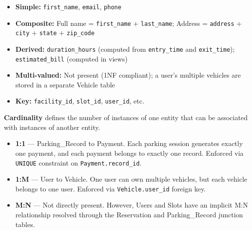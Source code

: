\documentclass[12pt,a4paper]{article}
\begin{document}
\begin{questionbox}
\end{questionbox}
\begin{answerbox}
\begin{itemize}[nosep]
    \item \textbf{Simple:} \texttt{first\_name}, \texttt{email}, \texttt{phone}
    \item \textbf{Composite:} Full name = \texttt{first\_name} + \texttt{last\_name}; Address = \texttt{address} + \texttt{city} + \texttt{state} + \texttt{zip\_code}
    \item \textbf{Derived:} \texttt{duration\_hours} (computed from \texttt{entry\_time} and \texttt{exit\_time}); \texttt{estimated\_bill} (computed in views)
    \item \textbf{Multi-valued:} Not present (1NF compliant); a user's multiple vehicles are stored in a separate Vehicle table
    \item \textbf{Key:} \texttt{facility\_id}, \texttt{slot\_id}, \texttt{user\_id}, etc.
\end{itemize}
\end{answerbox}

\begin{questionbox}
\end{questionbox}
\begin{answerbox}
\textbf{Cardinality} defines the number of instances of one entity that can be associated with instances of another entity.

\begin{itemize}[nosep]
    \item \textbf{1:1} --- Parking\_Record to Payment. Each parking session generates exactly one payment, and each payment belongs to exactly one record. Enforced via \texttt{UNIQUE} constraint on \texttt{Payment.record\_id}.
    \item \textbf{1:M} --- User to Vehicle. One user can own multiple vehicles, but each vehicle belongs to one user. Enforced via \texttt{Vehicle.user\_id} foreign key.
    \item \textbf{M:N} --- Not directly present. However, Users and Slots have an implicit M:N relationship resolved through the Reservation and Parking\_Record junction tables.
\end{itemize}
\end{answerbox}

\end{document}
